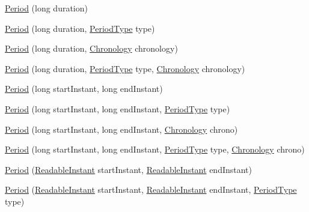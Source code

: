 \begin{DoxyCompactItemize}
\item 
\hyperlink{classorg_1_1joda_1_1time_1_1_period_ab88f7b2a913a9ed02bb6d3f338d4d8e2}{Period} (long duration)
\item 
\hyperlink{classorg_1_1joda_1_1time_1_1_period_a9ebcfb098dcc6ed27996a2cc2b3fa3c9}{Period} (long duration, \hyperlink{classorg_1_1joda_1_1time_1_1_period_type}{Period\-Type} type)
\item 
\hyperlink{classorg_1_1joda_1_1time_1_1_period_a4c9a81be9181066058666e2ec113f044}{Period} (long duration, \hyperlink{classorg_1_1joda_1_1time_1_1_chronology}{Chronology} chronology)
\item 
\hyperlink{classorg_1_1joda_1_1time_1_1_period_ae45ccf20bb714918f8067f871d62ca45}{Period} (long duration, \hyperlink{classorg_1_1joda_1_1time_1_1_period_type}{Period\-Type} type, \hyperlink{classorg_1_1joda_1_1time_1_1_chronology}{Chronology} chronology)
\item 
\hyperlink{classorg_1_1joda_1_1time_1_1_period_a61475b0a95d2fda2525dd3238b544ac9}{Period} (long start\-Instant, long end\-Instant)
\item 
\hyperlink{classorg_1_1joda_1_1time_1_1_period_aeca9aa63a238a65d40303929e90570bb}{Period} (long start\-Instant, long end\-Instant, \hyperlink{classorg_1_1joda_1_1time_1_1_period_type}{Period\-Type} type)
\item 
\hyperlink{classorg_1_1joda_1_1time_1_1_period_a27e642b6ac858290550f6580bcdd7e81}{Period} (long start\-Instant, long end\-Instant, \hyperlink{classorg_1_1joda_1_1time_1_1_chronology}{Chronology} chrono)
\item 
\hyperlink{classorg_1_1joda_1_1time_1_1_period_afd2cd26684c8f9cef6dfacade9618100}{Period} (long start\-Instant, long end\-Instant, \hyperlink{classorg_1_1joda_1_1time_1_1_period_type}{Period\-Type} type, \hyperlink{classorg_1_1joda_1_1time_1_1_chronology}{Chronology} chrono)
\item 
\hyperlink{classorg_1_1joda_1_1time_1_1_period_aae79300cf570a56a0b3d081956cdcefa}{Period} (\hyperlink{interfaceorg_1_1joda_1_1time_1_1_readable_instant}{Readable\-Instant} start\-Instant, \hyperlink{interfaceorg_1_1joda_1_1time_1_1_readable_instant}{Readable\-Instant} end\-Instant)
\item 
\hyperlink{classorg_1_1joda_1_1time_1_1_period_a29150b7afe5b5e745d23b13aa0cc93a2}{Period} (\hyperlink{interfaceorg_1_1joda_1_1time_1_1_readable_instant}{Readable\-Instant} start\-Instant, \hyperlink{interfaceorg_1_1joda_1_1time_1_1_readable_instant}{Readable\-Instant} end\-Instant, \hyperlink{classorg_1_1joda_1_1time_1_1_period_type}{Period\-Type} type)

\end{DoxyCompactItemize}
